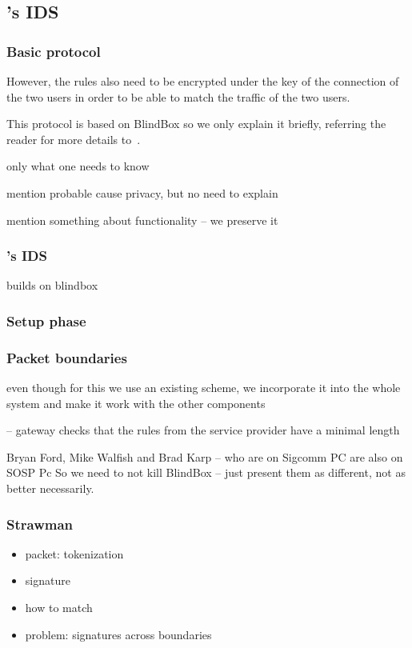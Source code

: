 \subsection{\sys's IDS}\label{sec:IDS}

\subsubsection{Basic protocol}

However, the rules also need to be encrypted
under the key of the connection of the two users in order to be able to match the 
traffic of the two users. 

This protocol is based on BlindBox so we only explain it briefly, referring the reader for more details to~\cite{blindbox}. 


only what one needs to know

mention probable cause privacy, but no need to explain

mention something about functionality -- we preserve it

\subsubsection{\sys's IDS}


builds on blindbox

\subsubsection{Setup phase}


\subsubsection{Packet boundaries}



even though for this we use an existing scheme, we incorporate it into the whole
system and make it work with the other components

-- gateway checks that the rules from the service provider have a minimal length 

Bryan Ford, Mike Walfish and Brad Karp -- who are on Sigcomm PC are also on SOSP Pc
So we need to not kill BlindBox -- just present them as different, not as better necessarily.


\subsubsection{Strawman}
\begin{itemize}
\item packet: tokenization
\item signature
\item how to match
\item problem: signatures across boundaries
\end{itemize}

